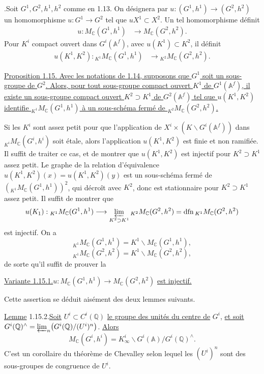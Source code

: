 \documentclass[10pt]{article}
\newcommand{\A}{\mathbb A}
\newcommand{\Af}{\mathbb A^f}
\newcommand{\C}{\mathbb C}
\newcommand{\Q}{\mathbb Q}
\newcommand{\dfn}{\operatorname{dfn}}
\newcommand{\limproj}{\varprojlim}
\newcommand{\MC}{M_{\C}}
\begin{document}
.\quad Soit $G^1,G^2,h^1,h^2$ comme en 1.13. On désignera par $u:(G^1,h^1)\to(G^2,h^2)$ un homomorphisme $u:G^1\to G^2$ tel que $uX^1\subset X^2$. Un tel homomorphisme définit
\begingroup
\makeatletter
\tagsleft@true
\makeatother
\begin{align}
u:\MC(G^1,h^1)&\longrightarrow\MC(G^2,h^2). \tag{1.14.1}
\end{align}
\endgroup
Pour $K^i$ compact ouvert dans $G^i(\Af)$, avec $u(K^1)\subset K^2$, il définit
\begingroup
\makeatletter
\tagsleft@true
\makeatother
\begin{align}
u(K^1,K^2):{}_{K^1}\MC(G^1,h^1)&\longrightarrow{}_{K^2}\MC(G^2,h^2). \tag{1.14.2}
\end{align}
\endgroup

\noindent\uline{Proposition 1.15. Avec les notations de 1.14, supposons que $G^1$ soit un sous-groupe de $G^2$. Alors, pour tout sous-groupe compact ouvert $K^1$ de $G^1(\Af)$, il existe un sous-groupe compact ouvert $K^2\supset K^1$ de $G^2(\Af)$ tel que $u(K^1,K^2)$ identifie ${}_{K^1}\MC(G^1,h^1)$ à un sous-schéma fermé de ${}_{K^2}\MC(G^2,h^2)$.}

Si les $K^i$ sont assez petit pour que l'application de $X^i\times(K\backslash G^i(\Af))$ dans ${}_{K^i}\MC(G^i,h^i)$ soit étale, alors l'application $u(K^1,K^2)$ est finie et non ramifiée. Il suffit de traiter ce cas, et de montrer que $u(K^1,K^2)$ est injectif pour $K^2\supset K^1$ assez petit. Le graphe de la relation d'équivalence $u(K^1,K^2)(x)=u(K^1,K^2)(y)$ est un sous-schéma fermé de $({}_{K^1}\MC(G^1,h^1))^2$, qui décroît avec $K^2$, donc est stationnaire pour $K^2\supset K^1$ assez petit. Il suffit de montrer que
\[
u(K_1):{}_{K^1}\MC(G^1,h^1)\longrightarrow\limproj_{K^2\supset K^1}{}_{K^2}\MC(G^2,h^2)=\dfn{}_{K^1}\MC(G^2,h^2)
\]
est injectif. On a
\[
{}_{K^1}\MC(G^1,h^1)=K^1\backslash \MC(G^1,h^1),
\]
\[
{}_{K^1}\MC(G^2,h^2)=K^1\backslash \MC(G^2,h^2),
\]
de sorte qu'il suffit de prouver la

\noindent\uline{Variante 1.15.1.}\quad $u:\MC(G^1,h^1)\longrightarrow\MC(G^2,h^2)$ \uline{est injectif.}



Cette assertion se déduit aisément des deux lemmes suivants.

\noindent\uline{Lemme} 1.15.2.\quad \uline{Soit} $U^i\subset C^i(\Q)$ \uline{le groupe des unités du centre de} $G^i$, \uline{et soit} $G^i(\Q)^\wedge=\limproj_n\bigl(G^i(\Q)/(U^i)^n\bigr)$. \uline{Alors}
\[
\MC(G^i,h^i)=K^i_\infty\backslash G^i(\A)/G^i(\Q)^\wedge .
\]
C'est un corollaire du théorème de Chevalley selon lequel les $(U^i)^n$ sont des sous-groupes de congruence de $U^i$.
\end{document}
